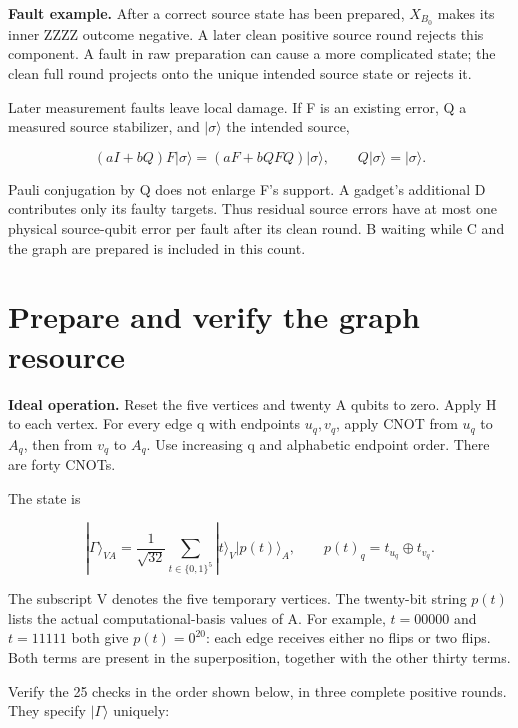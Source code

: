 \documentclass[11pt]{article}
\begin{document}
\textbf{Fault example.} After a correct source state has been prepared, \(X_{B_0}\) makes its inner ZZZZ outcome negative. A later clean positive source round rejects this component. A fault in raw preparation can cause a more complicated state; the clean full round projects onto the unique intended source state or rejects it.

Later measurement faults leave local damage. If F is an existing error, Q a measured source stabilizer, and \(|\sigma\rangle\) the intended source,

\[
(aI+bQ)F|\sigma\rangle=(aF+bQFQ)|\sigma\rangle,
\qquad Q|\sigma\rangle=|\sigma\rangle.
\]

Pauli conjugation by Q does not enlarge F's support. A gadget's additional D contributes only its faulty targets. Thus residual source errors have at most one physical source-qubit error per fault after its clean round. B waiting while C and the graph are prepared is included in this count.

\section{Prepare and verify the graph resource}
\textbf{Ideal operation.} Reset the five vertices and twenty A qubits to zero. Apply H to each vertex. For every edge q with endpoints \(u_q,v_q\), apply CNOT from \(u_q\) to \(A_q\), then from \(v_q\) to \(A_q\). Use increasing q and alphabetic endpoint order. There are forty CNOTs.

The state is

\[
|\Gamma\rangle_{VA}=\frac1{\sqrt{32}}\sum_{t\in\{0,1\}^5}
|t\rangle_V|p(t)\rangle_A,\qquad p(t)_q=t_{u_q}\oplus t_{v_q}.
\]

\begin{center}\begin{minipage}{\linewidth}

\end{minipage}\end{center}

The subscript V denotes the five temporary vertices. The twenty-bit string \(p(t)\) lists the actual computational-basis values of A. For example, \(t=00000\) and \(t=11111\) both give \(p(t)=0^{20}\): each edge receives either no flips or two flips. Both terms are present in the superposition, together with the other thirty terms.

Verify the 25 checks in the order shown below, in three complete positive rounds. They specify \(|\Gamma\rangle\) uniquely:
\end{document}
